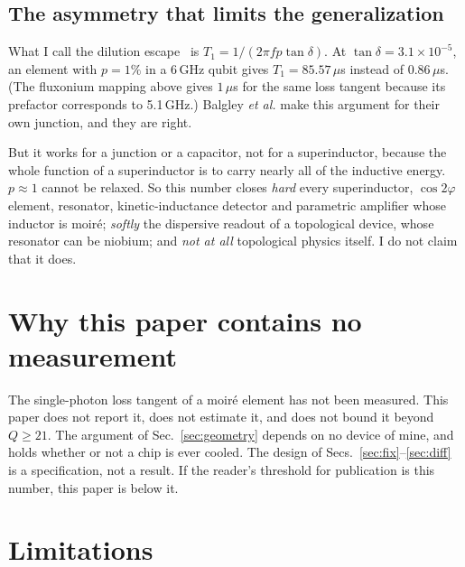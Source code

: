 \documentclass[aps,prb,reprint,superscriptaddress,longbibliography]{revtex4-2}
\begin{document}
\subsection{The asymmetry that limits the generalization}

What I call the dilution escape~\cite{Balgley2025} is
$T_1 = 1/(2\pi f p \tan\delta)$. At $\tan\delta = 3.1 \times 10^{-5}$, an
element with $p = 1\%$ in a 6\,GHz qubit gives $T_1 = 85.57\,\mu$s
instead of $0.86\,\mu$s. (The fluxonium mapping above gives $1\,\mu$s
for the same loss tangent because its prefactor corresponds to
5.1\,GHz.) Balgley \emph{et al.} make this argument for their own
junction, and they are right.

But it works for a junction or a capacitor, not for a superinductor,
because the whole function of a superinductor is to carry nearly all of
the inductive energy. $p \approx 1$ cannot be relaxed. So this number
closes \emph{hard} every superinductor, $\cos 2\varphi$ element,
resonator, kinetic-inductance detector and parametric amplifier whose
inductor is moir\'e; \emph{softly} the dispersive readout of a
topological device, whose resonator can be niobium; and \emph{not at
all} topological physics itself. I do not claim that it does.

\section{Why this paper contains no measurement}
\label{sec:nomeas}

The single-photon loss tangent of a moir\'e element has not been
measured. This paper does not report it, does not estimate it, and does
not bound it beyond $Q \geq 21$. The argument of
Sec.~\ref{sec:geometry} depends on no device of mine, and holds whether
or not a chip is ever cooled. The design of Secs.~\ref{sec:fix}--\ref{sec:diff}
is a specification, not a result. If the reader's threshold for
publication is this number, this paper is below it.

\section{Limitations}
\end{document}
